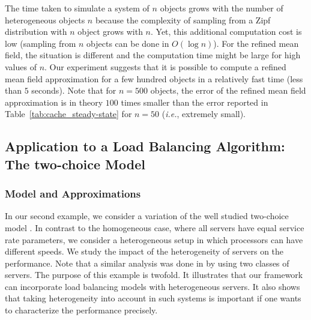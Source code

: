 \documentclass[acmsmall]{acmart}
\begin{document}
{The time taken to simulate a system of $n$ objects grows with the number of heterogeneous objects $n$ because the complexity of sampling from a Zipf distribution with $n$ object grows with $n$. Yet, this additional computation cost is low (sampling from $n$ objects can be done in $O(\log n)$).  For the refined mean field, the situation is different and the computation time might be large for high values of $n$. Our experiment suggests that it is possible to compute a refined mean field approximation for a few hundred objects in a relatively fast time (less than $5$ seconds). Note that for $n=500$ objects, the error of the refined mean field approximation is in theory $100$ times smaller than the error reported in Table~\ref{tab:cache_steady-state} for $n=50$ (\emph{i.e.}, extremely small). 
} 


\subsection{Application to a Load Balancing Algorithm: The two-choice Model}
\label{ssec:lbm}


\subsubsection{Model and Approximations}

In our second example, we consider a variation of the well studied two-choice model \cite{mitzenmacherPowerTwoChoices2001}. In contrast to the homogeneous case, where all servers have equal service rate parameters, we consider a heterogeneous setup in which processors can have different speeds. We study the impact of the heterogeneity of servers on the performance. Note that a similar analysis was done in \cite{mukhopadhyayAnalysisLoadBalancing2015} by using two classes of servers. The purpose of this example is twofold. It illustrates that our framework can incorporate load balancing models with heterogeneous servers. It also shows that taking heterogeneity into account in such systems is important if one wants to characterize the performance precisely.
\end{document}
